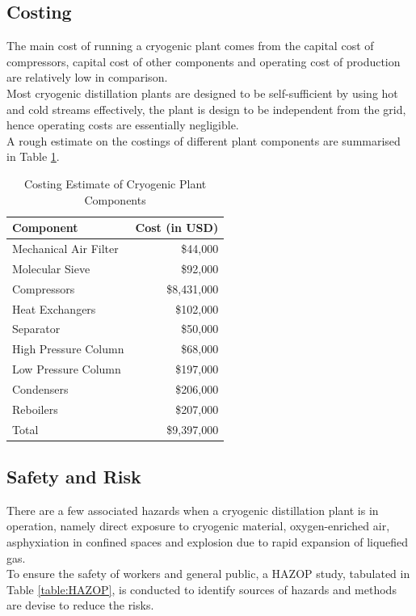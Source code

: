 \subsection{Costing} \noindent
The main cost of running a cryogenic plant comes from the capital cost of compressors, capital cost of other components and operating cost of production are relatively low in comparison. \\
Most cryogenic distillation plants are designed to be self-sufficient by using hot and cold streams effectively, the plant is design to be independent from the grid, hence operating costs are essentially negligible.\\
A rough estimate on the costings of different plant components are summarised in Table \ref{table:cost}.
\begin{table}[H]
    \singlespacing
    \centering
    \caption{Costing Estimate of Cryogenic Plant Components}
    \label{table:cost}
    \begin{tabular}{|l|r|}
        \hline
        Component                               & Cost (in USD)    \\     \hline
        Mechanical Air Filter \citep{matches}   & \$44,000         \\
        Molecular Sieve \citep{couper2012}      & \$92,000         \\
        Compressors \citep{matches}             & \$8,431,000      \\
        Heat Exchangers \citep{douglas1988}     & \$102,000        \\
        Separator \citep{matches}               & \$50,000         \\
        High Pressure Column \citep{douglas1988} & \$68,000         \\
        Low Pressure Column \citep{douglas1988}  & \$197,000        \\
        Condensers \citep{douglas1988}           & \$206,000        \\
        Reboilers \citep{douglas1988}            & \$207,000        \\     \hline
        Total                 & \$9,397,000     \\     \hline
    \end{tabular}
\end{table}

\subsection{Safety and Risk} \noindent
There are a few associated hazards when a cryogenic distillation plant is in operation, namely direct exposure to cryogenic material, oxygen-enriched air, asphyxiation in confined spaces and explosion due to rapid expansion of liquefied gas. \\
To ensure the safety of workers and general public, a HAZOP study, tabulated in Table \ref{table:HAZOP}, is conducted to identify sources of hazards and methods are devise to reduce the risks.
